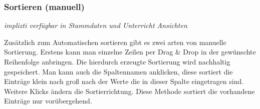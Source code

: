 \subsubsection{Sortieren (manuell)}
{\small\textit{implizti verfügbar in Stammdaten und Unterricht Ansichten\\}\par}

\noindent
Zusätzlich zum Automatischen sortieren gibt es zwei arten von manuelle Sortierung. Erstens kann man einzelne Zeilen per Drag \& Drop in der gewünschte Reihenfolge anbringen. Die hierdurch erzeugte Sortierung wird nachhaltig gespeichert. Man kann auch die Spaltennamen anklicken, diese sortiert die Einträge klein nach groß nach der Werte die in dieser Spalte eingetragen sind. Weitere Klicks ändern die Sortierrichtung. Diese Methode sortiert die vorhandene Einträge nur vorübergehend.